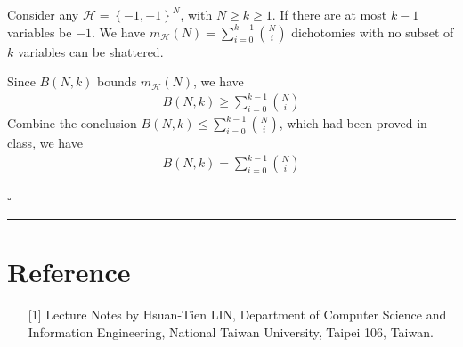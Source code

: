 \documentclass[12pt]{article}
\newcommand*{\QEDB}{\hfill\ensuremath{\square}}
\newcommand{\CBrackets}[1]{\left\{#1\right\}}
\newcommand{\ParTh}[1]{\left(#1\right)}
\newcommand{\horrule}[1]{\rule{\linewidth}{#1}}
\begin{document}

Consider any $\mathcal{H}=\CBrackets{-1,+1}^N$, with $N\geq k\geq 1$. If there are at most $k-1$ variables be $-1$. We have $m_{\mathcal{H}}\ParTh{N}=\sum_{i=0}^{k-1}\binom{N}{i}$ dichotomies with no subset of $k$ variables can be shattered.

Since $B\ParTh{N,k}$ bounds $m_{\mathcal{H}}\ParTh{N}$, we have
\begin{align}
B\ParTh{N,k}\geq\sum_{i=0}^{k-1}\binom{N}{i}
\end{align}
Combine the conclusion $B\ParTh{N,k}\leq\sum_{i=0}^{k-1}\binom{N}{i}$, which had been proved in class, we have
\begin{align}
B\ParTh{N,k}=\sum_{i=0}^{k-1}\binom{N}{i}
\end{align}

\QEDB

\horrule{0.5pt}

\section*{Reference}

\begin{enumerate}

\item[{[1]}] Lecture Notes by Hsuan-Tien LIN, Department of Computer Science and Information Engineering, National Taiwan University, Taipei 106, Taiwan.

\end{enumerate}
\end{document}
